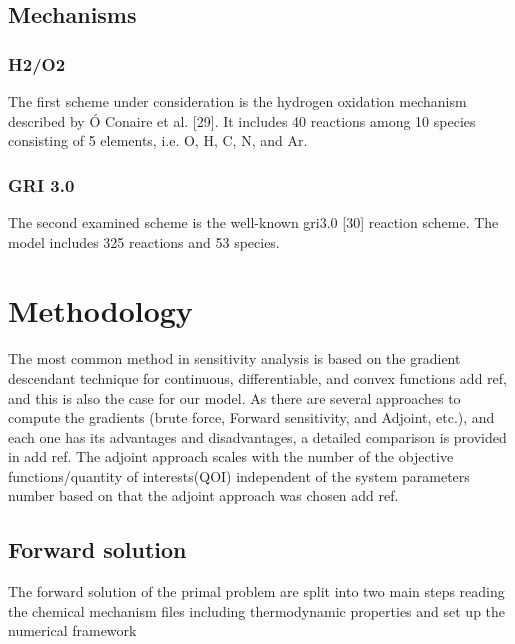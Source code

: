\documentclass[preprint,review,12pt]{elsarticle}
\begin{document}
\subsection{Mechanisms}
\subsubsection{H2/O2}
The first scheme under consideration is the hydrogen oxidation mechanism described by Ó Conaire et al. [29]. It includes 40 reactions among 10 species consisting of 5 elements, i.e. O, H, C, N, and Ar.

\subsubsection{GRI 3.0}
The second examined scheme is the well-known gri3.0 [30] reaction scheme. The model includes 325 reactions and 53 species.
\section{Methodology}
\label{Methodology}
The most common method in sensitivity analysis is based on the gradient descendant technique for continuous, differentiable, and convex functions {\color{red} add ref}, and this is also the case for our model.
 As there are several approaches to compute the gradients (brute force, Forward sensitivity, and Adjoint, etc.), and each one has its advantages and disadvantages, a detailed comparison is provided in  {\color{red} add ref}. The adjoint approach scales with the number of the objective functions/quantity of interests(QOI) independent of the system parameters number based on that the adjoint approach was chosen{\color{red} add ref}.  
\subsection{Forward solution}
The forward solution of the primal problem  are split into two main steps reading the chemical mechanism files including thermodynamic properties and set up the numerical framework    	
\end{document}
